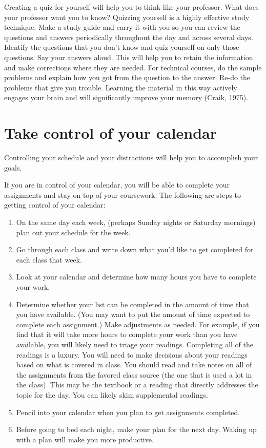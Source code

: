 \documentclass[../main.tex]{subfiles}
\begin{document}
Creating a quiz for yourself will help you to think like your professor. What
does your professor want you to know? Quizzing yourself is a highly effective
study technique. Make a study guide and carry it with you so you can review the
questions and answers periodically throughout the day and across several days.
Identify the questions that you don't know and quiz yourself on only those
questions. Say your answers aloud. This will help you to retain the information
and make corrections where they are needed. For technical courses, do the sample
problems and explain how you got from the question to the answer. Re-do the
problems that give you trouble. Learning the material in this way actively
engages your brain and will significantly improve your memory (Craik, 1975).
%
\section{Take control of your calendar}
Controlling your schedule and your distractions will help you to accomplish your
goals.

If you are in control of your calendar, you will be able to complete your
assignments and stay on top of your coursework. The following are steps to
getting control of your calendar:
%
\begin{enumerate}
  \item On the same day each week, (perhaps Sunday nights or Saturday mornings)
    plan out your schedule for the week.
  \item Go through each class and write down what you'd like to get completed
    for each class that week.
  \item Look at your calendar and determine how many hours you have to complete
    your work.
  \item Determine whether your list can be completed in the amount of time that
    you have available. (You may want to put the amount of time expected to
    complete each assignment.) Make adjustments as needed. For example, if you
    find that it will take more hours to complete your work than you have
    available, you will likely need to triage your readings. Completing all of
    the readings is a luxury. You will need to make decisions about your
    readings based on what is covered in class. You should read and take notes
    on all of the assignments from the favored class source (the one that is
    used a lot in the class). This may be the textbook or a reading that
    directly addresses the topic for the day. You can likely skim supplemental
    readings.
  \item Pencil into your calendar when you plan to get assignments completed.
  \item Before going to bed each night, make your plan for the next day. Waking
    up with a plan will make you more productive.
\end{enumerate}
%
\end{document}
